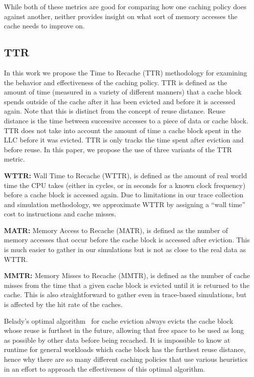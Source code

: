 While both of these metrics are good for comparing how one caching policy does against another,
	neither provides insight on what sort of memory accesses the cache needs to improve on.

\subsection{TTR}
\label{sec:metrics}
In this work we propose the Time to Recache (TTR) methodology for examining the behavior and effectiveness of the caching policy.
TTR is defined as the amount of time (measured in a variety of different manners) that a cache block spends outside of the cache after it has been evicted and before it is accessed again.
Note that this is distinct from the concept of reuse distance. 
Reuse distance is the time between successive accesses to a piece of data or cache block. 
TTR does not take into account the amount of time a cache block spent in the LLC before it was evicted.  
TTR is only tracks the time spent after eviction and before reuse.
In this paper, we propose the use of three variants of the TTR metric. 

\textbf{WTTR:}
Wall Time to Recache (WTTR), is defined as the amount of real world time the CPU takes (either in cycles, or in seconds for a known clock frequency) before a cache block is accessed again.
Due to limitations in our trace collection and simulation methodology, we approximate WTTR by assigning a ``wall time'' cost to instructions and cache misses.

\textbf{MATR:}
Memory Access to Recache (MATR), is defined as the number of memory accesses that occur before the cache block is accessed after eviction.
This is much easier to gather in our simulations but is not as close to the real data as WTTR.

\textbf{MMTR:}
Memory Misses to Recache (MMTR), is defined as the number of cache misses from the time that a given cache block is evicted until it is returned to the cache.
This is also straightforward to gather even in trace-based simulations, but is affected by the hit rate of the caches.

Belady's optimal algorithm~\cite{belady66} for cache eviction always evicts the cache block whose reuse is furthest in the future,
 allowing that free space to be used as long as possible by other data before being recached.
It is impossible to know at runtime for general workloads which cache block has the furthest reuse distance,
 hence why there are so many different caching policies that use various heuristics in an effort to approach the effectiveness of this optimal algorithm.

